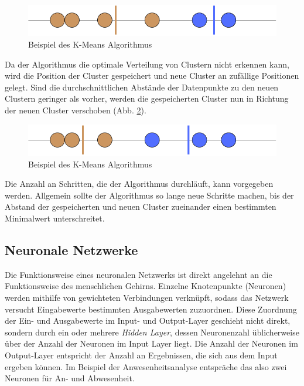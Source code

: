\begin{figure}[h]
    \centering
    \includegraphics[width=12.0cm]{pic/KMeans_step1.png}
    \caption{Beispiel des K-Means Algorithmus}
    \label{fig:KMeans1}
\end{figure}

Da der Algorithmus die optimale Verteilung von Clustern nicht erkennen kann, wird die Position der Cluster 
gespeichert und neue Cluster an zufällige Positionen gelegt. Sind die durchschnittlichen Abstände der Datenpunkte
zu den neuen Clustern geringer als vorher, werden die gespeicherten Cluster nun in Richtung der neuen Cluster 
verschoben (Abb. \ref{fig:KMeans2}).\\

\begin{figure}[h]
    \centering
    \includegraphics[width=12.0cm]{pic/KMeans_step2.png}
    \caption{Beispiel des K-Means Algorithmus}
    \label{fig:KMeans2}
\end{figure}

Die Anzahl an Schritten, die der Algorithmus durchläuft, kann vorgegeben werden. Allgemein sollte der Algorithmus
so lange neue Schritte machen, bis der Abstand der gespeicherten und neuen Cluster zueinander einen bestimmten
Minimalwert unterschreitet.

\newpage
\subsection{Neuronale Netzwerke}
Die Funktionsweise eines neuronalen Netzwerks ist direkt angelehnt an die Funktionsweise des menschlichen Gehirns.
Einzelne Knotenpunkte (Neuronen) werden mithilfe von gewichteten Verbindungen verknüpft, sodass das Netzwerk versucht 
Eingabewerte bestimmten Ausgabewerten zuzuordnen. Diese Zuordnung der Ein- und Ausgabewerte im Input- und Output-Layer 
geschieht nicht direkt, sondern durch ein oder mehrere \textit{Hidden Layer}, dessen Neuronenzahl üblicherweise über 
der Anzahl der Neuronen im Input Layer liegt. Die Anzahl der Neuronen im Output-Layer entspricht der Anzahl an Ergebnissen, 
die sich aus dem Input ergeben können. Im Beispiel der Anwesenheitsanalyse entspräche das also zwei Neuronen für 
An- und Abwesenheit.

